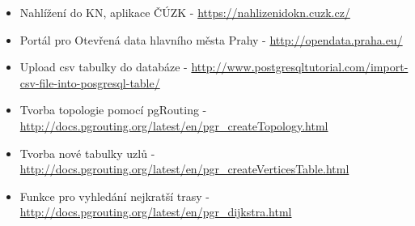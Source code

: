 \documentclass[a4paper, 12pt]{article}
\begin{document}
\begin{itemize}
\item Nahlížení do KN, aplikace ČÚZK - \url{https://nahlizenidokn.cuzk.cz/} 

\item Portál pro Otevřená data hlavního města Prahy - \url{http://opendata.praha.eu/}

\item Upload csv tabulky do databáze - \url{http://www.postgresqltutorial.com/import-csv-file-into-posgresql-table/}

\item Tvorba topologie pomocí pgRouting - \url{http://docs.pgrouting.org/latest/en/pgr\_createTopology.html}

\item Tvorba nové tabulky uzlů - \url{http://docs.pgrouting.org/latest/en/pgr\_createVerticesTable.html}

\item Funkce pro vyhledání nejkratší trasy - \url{http://docs.pgrouting.org/latest/en/pgr\_dijkstra.html}

\end{itemize}
\end{document}
